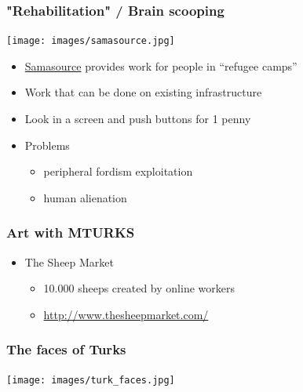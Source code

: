 \documentclass{beamer}
\begin{document}
\begin{frame}
\frametitle{"Rehabilitation" / Brain scooping}
\label{sec-5_3}


 \texttt{[image: images/samasource.jpg]}

\begin{itemize}
\item \href{http://www.samasource.org}{Samasource} provides work  for people  in ``refugee camps''
\item Work that can be done on existing infrastructure
\item Look in a screen and push buttons for 1 penny
\end{itemize}
\begin{itemize}

\item Problems
\label{sec-5_3_1}%
\begin{itemize}
\item peripheral fordism exploitation
\item human alienation
\end{itemize}


\end{itemize} %
\end{frame}
\begin{frame}
\frametitle{Art with MTURKS}
\label{sec-5_4}


\begin{itemize}
\item The Sheep Market

\begin{itemize}
\item 10.000 sheeps created by online workers
\item \href{http://www.thesheepmarket.com/}{http://www.thesheepmarket.com/}
\end{itemize}

\end{itemize}
\end{frame}
\begin{frame}
\frametitle{The faces of Turks}
\label{sec-5_5}


\texttt{[image: images/turk\_faces.jpg]}
\end{frame}
\end{document}

